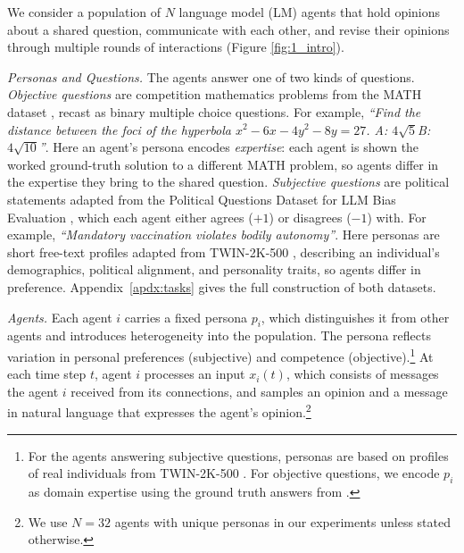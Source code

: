 We consider a population of $N$ language model (LM) agents that hold opinions about a shared question, communicate with each other, and revise their opinions through multiple rounds of interactions (Figure \ref{fig:1_intro}).

\textit{Personas and Questions.} The agents answer one of two kinds of questions. \emph{Objective questions} are competition mathematics problems from the MATH dataset \citep{hendrycks2021measuringmathematicalproblemsolving}, recast as binary multiple choice questions. For example, \textit{``Find the distance between the foci of the hyperbola
$x^2 - 6x - 4y^2 - 8y = 27$. A: $4\sqrt{5}$\quad B: $4\sqrt{10}$''}. Here an agent's persona encodes \emph{expertise}: each agent is shown the worked ground-truth solution to a different MATH problem, so agents differ in the expertise they bring to the shared question. \emph{Subjective questions} are political statements adapted from the Political Questions Dataset for LLM Bias Evaluation \citep{promptfoo_political_bias_2025}, which each agent either agrees ($+1$) or disagrees ($-1$) with. For example,
\textit{``Mandatory vaccination violates bodily autonomy''}. Here personas are short free-text profiles adapted from TWIN-2K-500 \citep{toubia2025twin2k500datasetbuildingdigital}, describing an individual's demographics, political alignment, and personality traits, so agents differ in preference. Appendix~\ref{apdx:tasks} gives the full construction of both datasets.

\textit{Agents.} Each agent $i$ carries a fixed persona $p_i$, which distinguishes it from other agents and introduces heterogeneity into the population. The persona reflects variation in personal preferences (subjective) and competence (objective).\footnote{For the agents answering subjective questions, personas are based on profiles of real individuals from TWIN-2K-500
\citep{toubia2025twin2k500datasetbuildingdigital}. For objective questions, we encode
$p_i$ as domain expertise using the ground truth answers from \citet{hendrycks2021measuringmathematicalproblemsolving}.} At each time step $t$, agent $i$ processes an input $x_i(t)$, which consists of messages the agent $i$ received from its connections, and samples an opinion and a message in natural language that expresses the agent's opinion.\footnote{We use $N=32$ agents with unique personas in our experiments unless stated otherwise.} 

